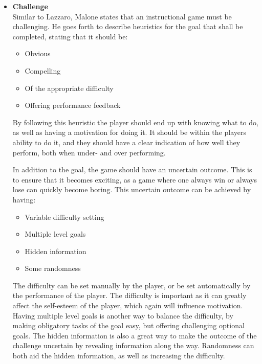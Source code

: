         \begin{itemize}
            \item \textbf{Challenge}\\
            Similar to Lazzaro, Malone states that an instructional game must be challenging. He goes forth to describe heuristics for the goal that shall be completed, stating that it should be:
            
            \begin{itemize}
                \item Obvious
                
                \item Compelling
                
                \item Of the appropriate difficulty
                
                \item Offering performance feedback
            \end{itemize}
            
            \SPACE
            
            By following this heuristic the player should end up with knowing what to do, as well as having a motivation for doing it. It should be within the players ability to do it, and they should have a clear indication of how well they perform, both when under- and over performing.
            
            In addition to the goal, the game should have an uncertain outcome. This is to ensure that it becomes exciting, as a game where one always win or always lose can quickly become boring. This uncertain outcome can be achieved by having:
            
            \begin{itemize}
                \item Variable difficulty setting
                
                \item Multiple level goals
                
                \item Hidden information
                
                \item Some randomness
            \end{itemize}
            
            \SPACE
            
            The difficulty can be set manually by the player, or be set automatically by the performance of the player. The difficulty is important as it can greatly affect the self-esteem of the player, which again will influence motivation. Having multiple level goals is another way to balance the difficulty, by making obligatory tasks of the goal easy, but offering challenging optional goals. The hidden information is also a great way to make the outcome of the challenge uncertain by revealing information along the way. Randomness can both aid the hidden information, as well as increasing the difficulty.
            

\end{itemize}
